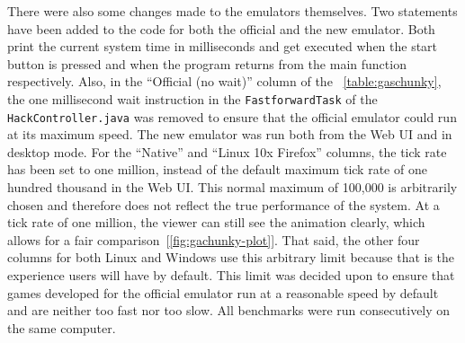 There were also some changes made to the emulators themselves.
Two statements have been added to the code for both the official and the new emulator.
Both print the current system time in milliseconds and get executed when the start button is pressed and when the program returns from the main function respectively.
Also, in the ``Official (no wait)'' column of the ~\cref{table:gaschunky}, the one millisecond wait instruction in the \verb+FastforwardTask+ of the \verb+HackController.java+ was removed to ensure that the official emulator could run at its maximum speed.
The new emulator was run both from the Web UI and in desktop mode.
For the ``Native'' and ``Linux 10x Firefox'' columns, the tick rate has been set to one million, instead of the default maximum tick rate of one hundred thousand in the Web UI.
This normal maximum of 100,000 is arbitrarily chosen and therefore does not reflect the true performance of the system.
At a tick rate of one million, the viewer can still see the animation clearly, which allows for a fair comparison~[\ref{fig:gachunky-plot}].
That said, the other four columns for both Linux and Windows use this arbitrary limit because that is the experience users will have by default.
This limit was decided upon to ensure that games developed for the official emulator run at a reasonable speed by default and are neither too fast nor too slow.
All benchmarks were run consecutively on the same computer.
